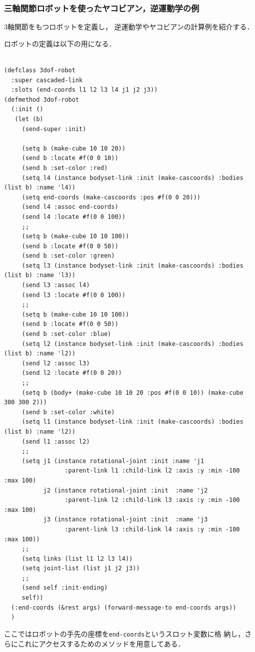 \subsubsection{三軸関節ロボットを使ったヤコビアン，逆運動学の例}

3軸関節をもつロボットを定義し，
逆運動学やヤコビアンの計算例を紹介する．

ロボットの定義は以下の用になる．
{\baselineskip=10pt
\begin{verbatim}

(defclass 3dof-robot
  :super cascaded-link
  :slots (end-coords l1 l2 l3 l4 j1 j2 j3))
(defmethod 3dof-robot
  (:init ()
   (let (b)
     (send-super :init)

     (setq b (make-cube 10 10 20))
     (send b :locate #f(0 0 10))
     (send b :set-color :red)
     (setq l4 (instance bodyset-link :init (make-cascoords) :bodies (list b) :name 'l4))
     (setq end-coords (make-cascoords :pos #f(0 0 20)))
     (send l4 :assoc end-coords)
     (send l4 :locate #f(0 0 100))
     ;;
     (setq b (make-cube 10 10 100))
     (send b :locate #f(0 0 50))
     (send b :set-color :green)
     (setq l3 (instance bodyset-link :init (make-cascoords) :bodies (list b) :name 'l3))
     (send l3 :assoc l4)
     (send l3 :locate #f(0 0 100))
     ;;
     (setq b (make-cube 10 10 100))
     (send b :locate #f(0 0 50))
     (send b :set-color :blue)
     (setq l2 (instance bodyset-link :init (make-cascoords) :bodies (list b) :name 'l2))
     (send l2 :assoc l3)
     (send l2 :locate #f(0 0 20))
     ;;
     (setq b (body+ (make-cube 10 10 20 :pos #f(0 0 10)) (make-cube 300 300 2)))
     (send b :set-color :white)
     (setq l1 (instance bodyset-link :init (make-cascoords) :bodies (list b) :name 'l2))
     (send l1 :assoc l2)
     ;;
     (setq j1 (instance rotational-joint :init :name 'j1
                 :parent-link l1 :child-link l2 :axis :y :min -100 :max 100)
           j2 (instance rotational-joint :init  :name 'j2
                 :parent-link l2 :child-link l3 :axis :y :min -100 :max 100)
           j3 (instance rotational-joint :init  :name 'j3
                 :parent-link l3 :child-link l4 :axis :y :min -100 :max 100))
     ;;
     (setq links (list l1 l2 l3 l4))
     (setq joint-list (list j1 j2 j3))
     ;;
     (send self :init-ending)
     self))
  (:end-coords (&rest args) (forward-message-to end-coords args))
  )
\end{verbatim}
}

ここではロボットの手先の座標を\verb|end-coords|というスロット変数に格
納し，さらにこれにアクセスするためのメソッドを用意してある．

